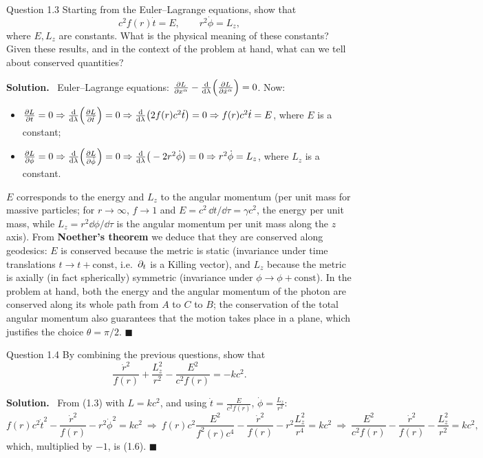 \documentclass[11pt,a4paper]{article}
\numberwithin{equation}{subsection}
\newenvironment{solution}{\par\noindent\textbf{\textcolor{excol!70!black}{Solution.}}\ }{\hfill$\blacksquare$\par\medskip}
\begin{document}
\begin{problem}{Question 1.3}
Starting from the Euler--Lagrange equations, show that
\[
  c^2f(r)\dot t=E,\qquad r^2\dot\phi=L_z, \tag{1.4--1.5}
\]
where $E,L_z$ are constants. What is the physical meaning of these constants? Given these results, and in the context of the problem at hand, what can we tell about conserved quantities?
\end{problem}
\begin{solution}
Euler--Lagrange equations: $\frac{\partial L}{\partial x^\alpha}-\frac{\mathrm{d}}{\mathrm{d}\lambda}\Big(\frac{\partial L}{\partial\dot x^\alpha}\Big)=0$. Now:
\begin{itemize}
\item $\frac{\partial L}{\partial t}=0\Rightarrow\frac{\mathrm{d}}{\mathrm{d}\lambda}\Big(\frac{\partial L}{\partial\dot t}\Big)=0\Rightarrow\frac{\mathrm{d}}{\mathrm{d}\lambda}\big(2f(r)c^2\dot t\big)=0\Rightarrow f(r)c^2\dot t=E$, where $E$ is a constant;
\item $\frac{\partial L}{\partial\phi}=0\Rightarrow\frac{\mathrm{d}}{\mathrm{d}\lambda}\Big(\frac{\partial L}{\partial\dot\phi}\Big)=0\Rightarrow\frac{\mathrm{d}}{\mathrm{d}\lambda}\big(-2r^2\dot\phi\big)=0\Rightarrow r^2\dot\phi=L_z$, where $L_z$ is a constant.
\end{itemize}
$E$ corresponds to the energy and $L_z$ to the angular momentum (per unit mass for massive particles; for $r\to\infty$, $f\to1$ and $E=c^2\,\dd t/\dd\tau=\gamma c^2$, the energy per unit mass, while $L_z=r^2\dd\phi/\dd\tau$ is the angular momentum per unit mass along the $z$ axis). From \textbf{Noether's theorem} we deduce that they are conserved along geodesics: $E$ is conserved because the metric is static (invariance under time translations $t\to t+\text{const}$, i.e.\ $\partial_t$ is a Killing vector), and $L_z$ because the metric is axially (in fact spherically) symmetric (invariance under $\phi\to\phi+\text{const}$). In the problem at hand, both the energy and the angular momentum of the photon are conserved along its whole path from $A$ to $C$ to $B$; the conservation of the total angular momentum also guarantees that the motion takes place in a plane, which justifies the choice $\theta=\pi/2$.
\end{solution}

\begin{problem}{Question 1.4}
By combining the previous questions, show that
\[
  \frac{\dot r^2}{f(r)}+\frac{L_z^2}{r^2}-\frac{E^2}{c^2f(r)}=-kc^2 . \tag{1.6}
\]
\end{problem}
\begin{solution}
From (1.3) with $L=kc^2$, and using $\dot t=\frac{E}{c^2f(r)}$, $\dot\phi=\frac{L_z}{r^2}$:
\[
  f(r)c^2\dot t^2-\frac{\dot r^2}{f(r)}-r^2\dot\phi^2=kc^2
  \ \Rightarrow\ f(r)c^2\frac{E^2}{f^2(r)c^4}-\frac{\dot r^2}{f(r)}-r^2\frac{L_z^2}{r^4}=kc^2
  \ \Rightarrow\ \frac{E^2}{c^2f(r)}-\frac{\dot r^2}{f(r)}-\frac{L_z^2}{r^2}=kc^2 ,
\]
which, multiplied by $-1$, is (1.6).
\end{solution}
\end{document}
